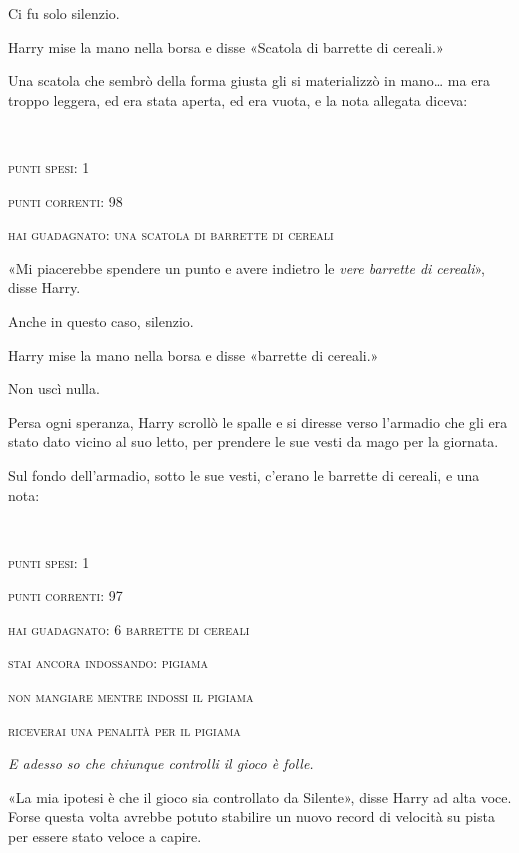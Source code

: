 Ci fu solo silenzio.

Harry mise la mano nella borsa e disse «Scatola di barrette di cereali.»

Una scatola che sembrò della forma giusta gli si materializzò in mano… ma era troppo leggera, ed era stata aperta, ed era vuota, e la nota allegata diceva:

\begin{addmargin}[3em]{3em}%
~

\textsc{punti spesi: 1}

\textsc{punti correnti: 98}

\textsc{hai guadagnato: una scatola di barrette di cereali}\\
\end{addmargin}

«Mi piacerebbe spendere un punto e avere indietro le \textit{vere barrette di cereali}», disse Harry.

Anche in questo caso, silenzio.

Harry mise la mano nella borsa e disse «barrette di cereali.»

Non uscì nulla.

Persa ogni speranza, Harry scrollò le spalle e si diresse verso l’armadio che gli era stato dato vicino al suo letto, per prendere le sue vesti da mago per la giornata.

Sul fondo dell’armadio, sotto le sue vesti, c’erano le barrette di cereali, e una nota:

\begin{addmargin}[3em]{3em}%
~

\textsc{punti spesi: 1}

\textsc{punti correnti: 97}

\textsc{hai guadagnato: 6 barrette di cereali}

\textsc{stai ancora indossando: pigiama}

\textsc{non mangiare mentre indossi il pigiama}

\textsc{riceverai una penalità per il pigiama}\\
\end{addmargin}

\textit{E adesso so che chiunque controlli il gioco è folle.}

«La mia ipotesi è che il gioco sia controllato da Silente», disse Harry ad alta voce. Forse questa volta avrebbe potuto stabilire un nuovo record di velocità su pista per essere stato veloce a capire.

